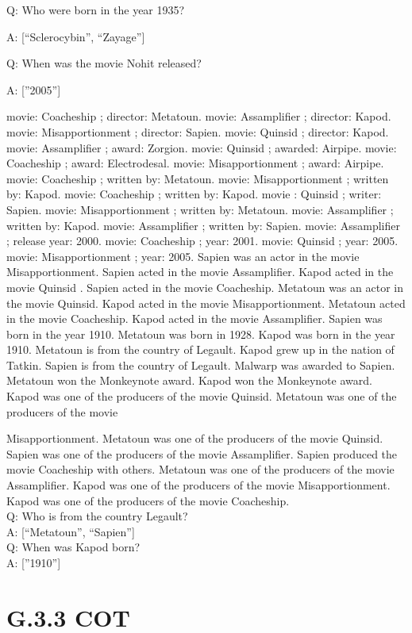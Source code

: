 \documentclass[
]{article}
\begin{document}
Q: Who were born in the year 1935?

A: {[}``Sclerocybin'', ``Zayage''{]}

Q: When was the movie Nohit released?

A: {[}''2005''{]}

movie: Coacheship ; director: Metatoun. movie: Assamplifier ; director:
Kapod. movie: Misapportionment ; director: Sapien. movie: Quinsid ;
director: Kapod. movie: Assamplifier ; award: Zorgion. movie: Quinsid ;
awarded: Airpipe. movie: Coacheship ; award: Electrodesal. movie:
Misapportionment ; award: Airpipe. movie: Coacheship ; written by:
Metatoun. movie: Misapportionment ; written by: Kapod. movie: Coacheship
; written by: Kapod. movie : Quinsid ; writer: Sapien. movie:
Misapportionment ; written by: Metatoun. movie: Assamplifier ; written
by: Kapod. movie: Assamplifier ; written by: Sapien. movie: Assamplifier
; release year: 2000. movie: Coacheship ; year: 2001. movie: Quinsid ;
year: 2005. movie: Misapportionment ; year: 2005. Sapien was an actor in
the movie Misapportionment. Sapien acted in the movie Assamplifier.
Kapod acted in the movie Quinsid . Sapien acted in the movie Coacheship.
Metatoun was an actor in the movie Quinsid. Kapod acted in the movie
Misapportionment. Metatoun acted in the movie Coacheship. Kapod acted in
the movie Assamplifier. Sapien was born in the year 1910. Metatoun was
born in 1928. Kapod was born in the year 1910. Metatoun is from the
country of Legault. Kapod grew up in the nation of Tatkin. Sapien is
from the country of Legault. Malwarp was awarded to Sapien. Metatoun won
the Monkeynote award. Kapod won the Monkeynote award. Kapod was one of
the producers of the movie Quinsid. Metatoun was one of the producers of
the movie

Misapportionment. Metatoun was one of the producers of the movie
Quinsid. Sapien was one of the producers of the movie Assamplifier.
Sapien produced the movie Coacheship with others. Metatoun was one of
the producers of the movie Assamplifier. Kapod was one of the producers
of the movie Misapportionment. Kapod was one of the producers of the
movie Coacheship.\\
Q: Who is from the country Legault?\\
A: {[}``Metatoun'', ``Sapien''{]}\\
Q: When was Kapod born?\\
A: {[}''1910''{]}

\section{G.3.3 COT}\label{g.3.3-cot}
\end{document}
